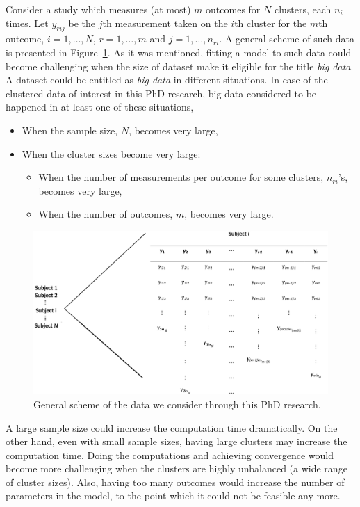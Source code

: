 \documentclass[14pt]{article}
\begin{document}
Consider a study which measures (at most) $m$ outcomes for $N$ clusters, each $n_i$ times. Let $y_{rij}$ be the $j$th measurement taken on the $i$th cluster for the $m$th outcome, $i=1,\ldots,N$, $r=1,\ldots,m$ and $j=1,\ldots,n_{ri}$. A general scheme of such data is presented in Figure~\ref{fig_scheme}. As it was mentioned, fitting a model to such data could become challenging when the size of dataset make it eligible for the title \emph{big data}. A dataset could be entitled as \emph{big data} in different situations. In case of the clustered data of interest in this PhD research, big data considered to be happened in at least one of these situations,
\begin{itemize}
\item When the sample size, $N$, becomes very large,
\item When the cluster sizes become very large:
\begin{itemize}
\item When the number of measurements per outcome for some clusters, $n_{ri}$'s, becomes very large,
\item When the number of outcomes, $m$, becomes very large.
\end{itemize}
\end{itemize}
\begin{figure}
\centering
\includegraphics[width=\textwidth]{scheme_new.eps}
\caption{General scheme of the data we consider through this PhD research.} 
\label{fig_scheme}
\end{figure} 
A large sample size could increase the computation time dramatically. On the other hand, even with small sample sizes, having large clusters may increase the computation time. Doing the computations and achieving convergence would become more challenging when the clusters are highly unbalanced (a wide range of cluster sizes). Also, having too many outcomes would increase the number of parameters in the model, to the point which it could not be feasible any more.  
\end{document}
